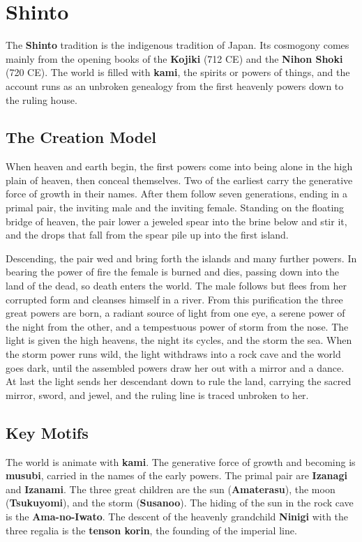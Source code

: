 \section{Shinto}

The \textbf{Shinto} tradition is the indigenous tradition of Japan. Its cosmogony comes mainly from the opening books of the \textbf{Kojiki} (712 CE) and the \textbf{Nihon Shoki} (720 CE). The world is filled with \textbf{kami}, the spirits or powers of things, and the account runs as an unbroken genealogy from the first heavenly powers down to the ruling house.

\subsection{The Creation Model}

When heaven and earth begin, the first powers come into being alone in the high plain of heaven, then conceal themselves. Two of the earliest carry the generative force of growth in their names. After them follow seven generations, ending in a primal pair, the inviting male and the inviting female. Standing on the floating bridge of heaven, the pair lower a jeweled spear into the brine below and stir it, and the drops that fall from the spear pile up into the first island.

Descending, the pair wed and bring forth the islands and many further powers. In bearing the power of fire the female is burned and dies, passing down into the land of the dead, so death enters the world. The male follows but flees from her corrupted form and cleanses himself in a river. From this purification the three great powers are born, a radiant source of light from one eye, a serene power of the night from the other, and a tempestuous power of storm from the nose. The light is given the high heavens, the night its cycles, and the storm the sea. When the storm power runs wild, the light withdraws into a rock cave and the world goes dark, until the assembled powers draw her out with a mirror and a dance. At last the light sends her descendant down to rule the land, carrying the sacred mirror, sword, and jewel, and the ruling line is traced unbroken to her.

\subsection{Key Motifs}

The world is animate with \textbf{kami}. The generative force of growth and becoming is \textbf{musubi}, carried in the names of the early powers. The primal pair are \textbf{Izanagi} and \textbf{Izanami}. The three great children are the sun (\textbf{Amaterasu}), the moon (\textbf{Tsukuyomi}), and the storm (\textbf{Susanoo}). The hiding of the sun in the rock cave is the \textbf{Ama-no-Iwato}. The descent of the heavenly grandchild \textbf{Ninigi} with the three regalia is the \textbf{tenson korin}, the founding of the imperial line.


